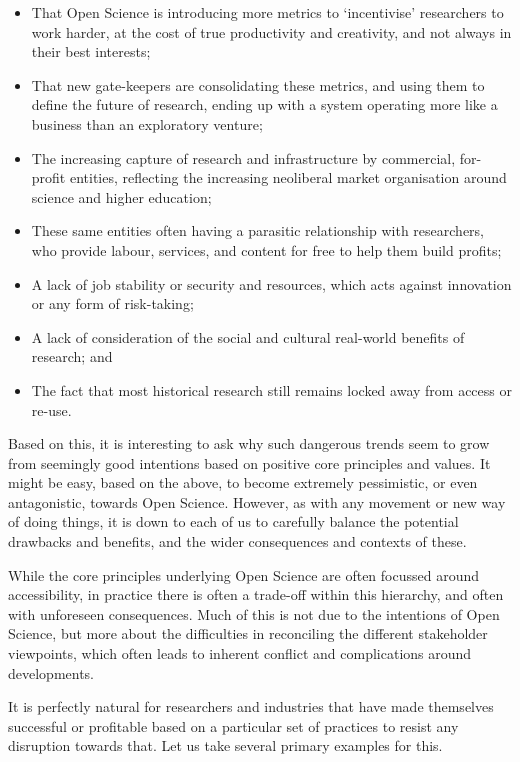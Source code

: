 \documentclass[]{book}
\begin{document}
{{{{\begin{itemize}
\item
  That Open Science is introducing more metrics to `incentivise' researchers to work harder, at the cost of true productivity and creativity, and not always in their best interests;
\item
  That new gate-keepers are consolidating these metrics, and using them to define the future of research, ending up with a system operating more like a business than an exploratory venture;
\item
  The increasing capture of research and infrastructure by commercial, for-profit entities, reflecting the increasing neoliberal market organisation around science and higher education;
\item
  These same entities often having a parasitic relationship with researchers, who provide labour, services, and content for free to help them build profits;
\item
  A lack of job stability or security and resources, which acts against innovation or any form of risk-taking;
\item
  A lack of consideration of the social and cultural real-world benefits of research; and
\item
  The fact that most historical research still remains locked away from access or re-use.
\end{itemize}

Based on this, it is interesting to ask why such dangerous trends seem to grow from seemingly good intentions based on positive core principles and values. It might be easy, based on the above, to become extremely pessimistic, or even antagonistic, towards Open Science. However, as with any movement or new way of doing things, it is down to each of us to carefully balance the potential drawbacks and benefits, and the wider consequences and contexts of these.

While the core principles underlying Open Science are often focussed around accessibility, in practice there is often a trade-off within this hierarchy, and often with unforeseen consequences. Much of this is not due to the intentions of Open Science, but more about the difficulties in reconciling the different stakeholder viewpoints, which often leads to inherent conflict and complications around developments.

It is perfectly natural for researchers and industries that have made themselves successful or profitable based on a particular set of practices to resist any disruption towards that. Let us take several primary examples for this.

}}}}
\end{document}

